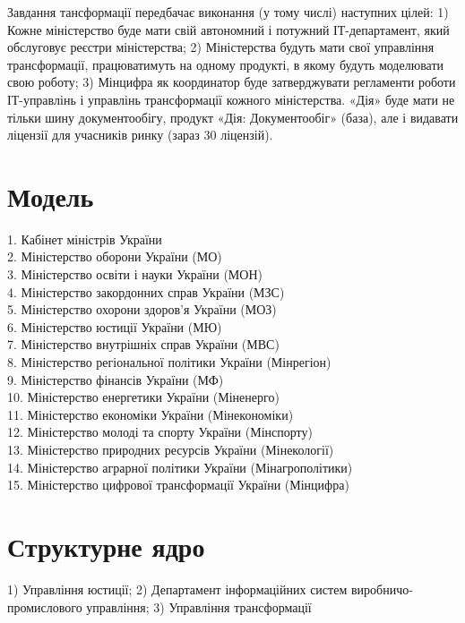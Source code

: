 Завдання тансформації передбачає виконання (у тому числі) наступних цілей:
1) Кожне міністерство буде мати свій автономний і потужний ІТ-департамент,
який обслуговує реєстри міністерства; 2) Міністерства будуть мати свої
управління трансформації, працюватимуть на одному продукті, в якому
будуть моделювати свою роботу; 3) Мінцифра як координатор буде затверджувати
регламенти роботи ІТ-управлінь і управлінь трансформації кожного міністерства.
«Дія» буде мати не тільки шину документообігу, продукт «Дія: Документообіг»
(база), але і видавати ліцензії для учасників ринку (зараз 30 ліцензій).

\section{Модель}

1. Кабінет міністрів України \\
2. Міністерство оборони України (МО) \\
3. Міністерство освіти і науки України (МОН) \\
4. Міністерство закордонних справ України (МЗС) \\
5. Міністерство охорони здоров'я України (МОЗ) \\
6. Міністерство юстиції України (МЮ) \\
7. Міністерство внутрішніх справ України (МВС) \\
8. Міністерство регіональної політики України (Мінрегіон) \\
9. Міністерство фінансів України (МФ) \\
10. Міністерство енергетики України (Міненерго) \\
11. Міністерство економіки України (Мінекономіки) \\
12. Міністерство молоді та спорту України (Мінспорту) \\
13. Міністерство природних ресурсів України (Мінекології) \\
14. Міністерство аграрної політики України (Мінагрополітики) \\
15. Міністерство цифрової трансформації України (Мінцифра) \\

\section{Структурне ядро}

1) Управління юстиції;
2) Департамент інформаційних систем виробничо-промислового управління;
3) Управління трансформації

